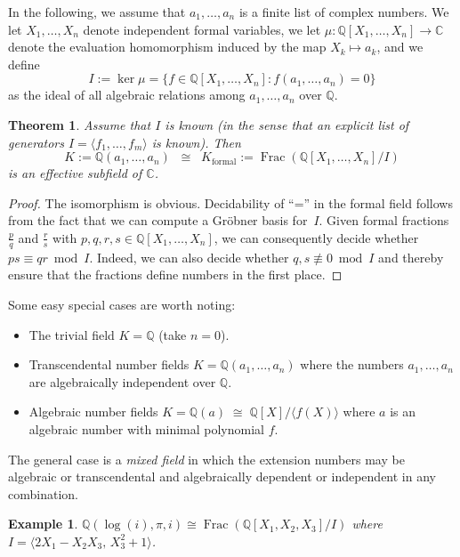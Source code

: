 \documentclass[11pt,a4paper]{article}
\newtheorem{example}{Example}
\newtheorem{theorem}{Theorem}
\begin{document}
In the following, we assume that $a_1,\ldots,a_n$ is a finite list of complex numbers.
We let $X_1,\ldots,X_n$ denote independent formal variables,
we let $\mu : \mathbb{Q}[X_1,\ldots,X_n] \to \mathbb{C}$ denote
the evaluation homomorphism
induced by the map $X_k \mapsto a_k$,
and we define $$I := \ker \mu = \{ f \in \mathbb{Q}[X_1,\ldots,X_n]: f(a_1,\ldots,a_n) = 0\}$$
as the ideal of all algebraic relations among $a_1,\ldots,a_n$ over $\mathbb{Q}$.

\begin{theorem}
Assume that $I$ is known (in the sense
that an explicit list of generators $I = \langle f_1, \ldots, f_m \rangle$ is known). Then
$$K := \mathbb{Q}(a_1,\ldots,a_n) \;\; \cong \;\; K_{\text{formal}} := \operatorname{Frac}(\mathbb{Q}[X_1,\ldots,X_n] / I)$$
is an effective subfield of $\mathbb{C}$.
\label{thm:effective}
\end{theorem}

\begin{proof}
The isomorphism is obvious.
Decidability of ``='' in the formal
field follows from the fact that we can compute a Gr\"{o}bner basis for~$I$.
Given
formal fractions $\tfrac{p}{q}$ and $\tfrac{r}{s}$ with
$p,q,r,s \in \mathbb{Q}[X_1,\ldots,X_n]$,
we can consequently decide whether $ps \equiv qr \bmod I$.
Indeed, we can also decide whether $q, s \not \equiv 0 \bmod I$ and thereby ensure that
the fractions define numbers in the first place.
\end{proof}

Some easy special cases are worth noting:

\begin{itemize}
\item The trivial field $K = \mathbb{Q}$ (take $n = 0$).
\item Transcendental number fields
$K = \mathbb{Q}(a_1,\ldots,a_n)$
where the numbers $a_1,\ldots,a_n$ are
algebraically independent over $\mathbb{Q}$.
\item Algebraic number fields $K = \mathbb{Q}(a) \; \cong \; \mathbb{Q}[X] / \langle f(X)\rangle$
where $a$ is an algebraic number with minimal polynomial $f$.
\end{itemize}

The general case is a \emph{mixed field} in which the extension
numbers may be algebraic or transcendental and algebraically
dependent or independent in any combination.

\begin{example}
$\mathbb{Q}(\log(i),\pi,i) \cong \operatorname{Frac}(\mathbb{Q}[X_1,X_2,X_3] / I)$
where $I = \langle 2 X_1 - X_2 X_3, \, X_3^2+1 \rangle$.
\end{example}
\end{document}
